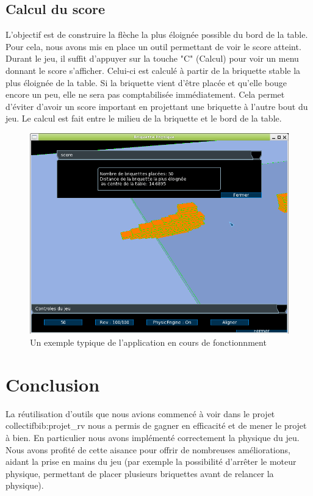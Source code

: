 \documentclass[frenchb,twoside]{EPURapport}
\begin{document}
    \section{Calcul du score}
        L'objectif est de construire la flèche la plus éloignée possible du bord
        de la table. Pour cela, nous avons mis en place un outil permettant de
        voir le score atteint. Durant le jeu, il suffit d'appuyer sur la touche
        "C" (Calcul) pour voir un menu donnant le score s'afficher.
        Celui-ci est calculé à partir de la briquette stable la plus éloignée
        de la table. Si la briquette vient d'être placée et qu'elle bouge encore
        un peu, elle ne sera pas comptabilisée immédiatement. Cela permet
        d'éviter d'avoir un score important en projettant une briquette à
        l'autre bout du jeu. Le calcul est fait entre le milieu de la briquette
        et le bord de la table.
    \begin{figure}[h]
		\centering
        \includegraphics[width=13cm]{images/score.png}
        \caption{\label{fig:jeux}Un exemple typique de l'application en cours de fonctionnment}
    \end{figure}
        
\chapter{Conclusion}
    La réutilisation d'outils que nous avions commencé à voir dans le projet
    collectif{bib:projet_rv} nous a permis de gagner en efficacité et de mener
    le projet à bien. En particulier nous avons implémenté correctement la
    physique du jeu. Nous avons profité de cette aisance pour offrir de
    nombreuses améliorations, aidant la prise en mains du jeu (par exemple la
    possibilité d'arrêter le moteur physique, permettant de placer plusieurs
    briquettes avant de relancer la physique).
\end{document}
